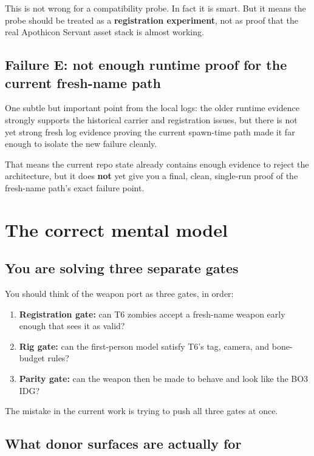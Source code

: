 \documentclass[11pt]{article}
\begin{document}
This is not wrong for a compatibility probe. In fact it is smart. But it means the probe should be treated as a \textbf{registration experiment}, not as proof that the real Apothicon Servant asset stack is almost working.

\subsection{Failure E: not enough runtime proof for the current fresh-name path}

One subtle but important point from the local logs: the older runtime evidence strongly supports the historical carrier and registration issues, but there is not yet strong fresh log evidence proving the current  spawn-time path made it far enough to isolate the new failure cleanly.

That means the current repo state already contains enough evidence to reject the architecture, but it does \textbf{not} yet give you a final, clean, single-run proof of the fresh-name path's exact failure point.

\section{The correct mental model}

\subsection{You are solving three separate gates}

You should think of the weapon port as three gates, in order:

\begin{enumerate}
  \item \textbf{Registration gate:} can T6 zombies accept a fresh-name weapon early enough that  sees it as valid?
  \item \textbf{Rig gate:} can the first-person model satisfy T6's tag, camera, and bone-budget rules?
  \item \textbf{Parity gate:} can the weapon then be made to behave and look like the BO3 IDG?
\end{enumerate}

The mistake in the current work is trying to push all three gates at once.

\subsection{What donor surfaces are actually for}
\end{document}
